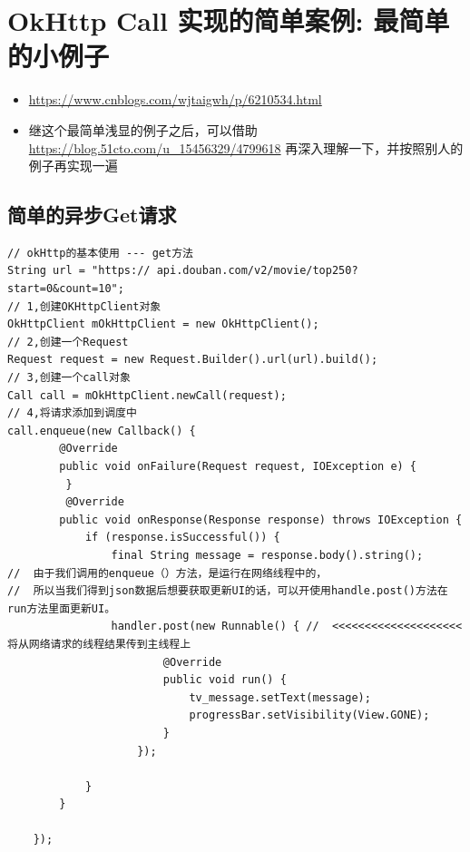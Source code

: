 \documentclass[9pt, b5paper]{article}
\begin{document}
\section{OkHttp Call 实现的简单案例: 最简单的小例子}
\label{sec-13}
\begin{itemize}
\item \url{https://www.cnblogs.com/wjtaigwh/p/6210534.html}
\item 继这个最简单浅显的例子之后，可以借助\url{https://blog.51cto.com/u_15456329/4799618} 再深入理解一下，并按照别人的例子再实现一遍
\end{itemize}
\subsection{简单的异步Get请求}
\label{sec-13-1}
\begin{verbatim}
// okHttp的基本使用 --- get方法
String url = "https:// api.douban.com/v2/movie/top250?start=0&count=10";
// 1,创建OKHttpClient对象
OkHttpClient mOkHttpClient = new OkHttpClient();
// 2,创建一个Request
Request request = new Request.Builder().url(url).build();
// 3,创建一个call对象
Call call = mOkHttpClient.newCall(request);
// 4,将请求添加到调度中
call.enqueue(new Callback() {
        @Override
        public void onFailure(Request request, IOException e) {
         }
         @Override
        public void onResponse(Response response) throws IOException {
            if (response.isSuccessful()) {
                final String message = response.body().string();
//  由于我们调用的enqueue（）方法，是运行在网络线程中的，
//  所以当我们得到json数据后想要获取更新UI的话，可以开使用handle.post()方法在run方法里面更新UI。                
                handler.post(new Runnable() { //  <<<<<<<<<<<<<<<<<<<<  将从网络请求的线程结果传到主线程上
                        @Override
                        public void run() {
                            tv_message.setText(message);
                            progressBar.setVisibility(View.GONE);
                        }
                    });
 
            }
        }
 
    });
\end{verbatim}
\end{document}
